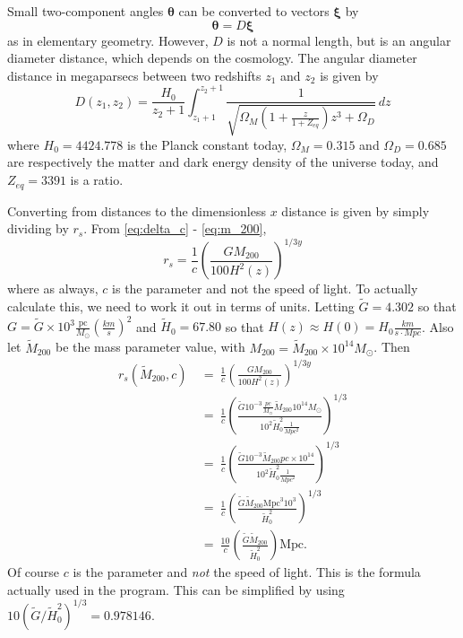 \documentclass[10pt,twoside]{article}
\theoremstyle{definition}
\theoremstyle{exercise}
\renewcommand{\v}[1]{\boldsymbol{#1}}%
\begin{document}
Small two-component angles $\v{\theta}$ can be converted to vectors $\v{\xi}$ by
\begin{equation}
		\v{\theta} = D \v{\xi}
		\label{eq:angle_vector_conversion}
\end{equation}
as in elementary geometry. However, $D$ is not a normal length, but is an angular diameter distance, which depends on the cosmology. The angular diameter distance in megaparsecs between two redshifts $z_1$ and $z_2$ is given by
\begin{equation}
		D(z_1,z_2) = \frac{H_0}{z_2+1} \int_{z_1+1}^{z_2+1} \frac{1}{\sqrt{\Omega_M\left( 1+\frac{z}{1+Z_{eq}} \right)z^3 + \Omega_D}} \, dz
		\label{eq:ang_di_dist}
\end{equation}
where $H_0 = 4424.778$ is the Planck constant today, $\Omega_M = 0.315$ and $\Omega_D =0.685$ are respectively the matter and dark energy density of the universe today, and $Z_{eq} = 3391$ is a ratio.

Converting from distances to the dimensionless $x$ distance is given by simply dividing by $r_s$. From \eqref{eq:delta_c} - \eqref{eq:m_200},
\begin{equation}
		r_s = \frac{1}{c}\left( \frac{G M_{200}}{100 H^2(z)} \right)^{1/3y}
		\label{eq:r_s_calculable}
\end{equation}
where as always, $c$ is the parameter and not the speed of light. To actually calculate this, we need to work it out in terms of units. Letting $\tilde{G} = 4.302$ so that $G = \tilde{G} \times 10^3 \frac{\text{pc}}{M_\odot}\left( \frac{km}{s} \right)^2$ and $\tilde{H}_0 = 67.80$ so that $H(z) \approx H(0) = H_0 \frac{km}{s\cdot Mpc}$. Also let $\tilde{M}_{200}$ be the mass parameter value, with $M_{200} = \tilde{M}_{200} \times 10^{14} M_\odot$. Then
\begin{align*}
		r_s(\tilde{M}_{200}, c) \ &=\ \frac{1}{c}\left( \frac{G M_{200}}{100 H^2(z)} \right)^{1/3y}\\
		\ &=\ \frac{1}{c} \left(  \frac{\tilde{G} 10^{-3} \frac{pc}{M_\odot} \tilde{M}_{200} 10^{14} M_\odot}{10^2 \tilde{H}_0^2 \frac{1}{Mpc^2}} \right)^{1/3}\\
		\ &=\ \frac{1}{c} \left( \frac{\tilde{G} 10^{-3} \tilde{M}_{200} pc \times 10^{14}}{10^2 \tilde{H}_0^2 \frac{1}{Mpc^2}} \right)^{1/3}\\
		\ &=\ \frac{1}{c} \left( \frac{\tilde{G} \tilde{M}_{200} \text{Mpc}^3 10^3}{\tilde{H}_0^2} \right)^{1/3}\\
		\ &=\ \frac{10}{c} \left( \frac{\tilde{G} \tilde{M}_{200}}{\tilde{H}_0^2} \right) \text{Mpc}.
\end{align*}
Of course $c$ is the parameter and \emph{not} the speed of light. This is the formula actually used in the program. This can be simplified by using $10 \left( \tilde{G}/\tilde{H}_0^2 \right)^{1/3} = 0.978146$.
\end{document}

